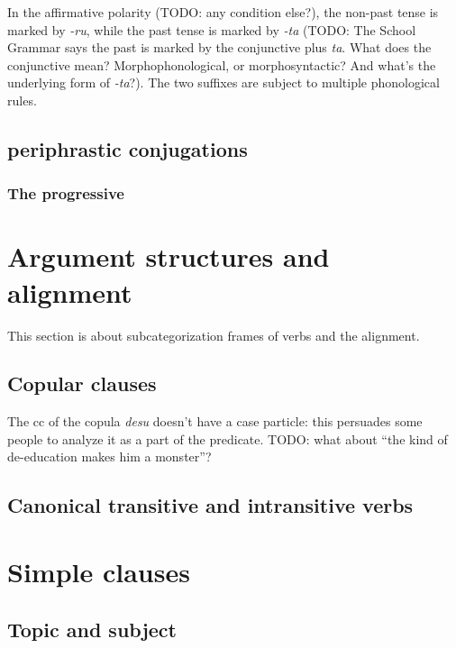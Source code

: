 \documentclass[UTF8, a4paper, oneside, scheme=plain]{ctexart}
\newcommand{\corpus}[1]{\emph{#1}}
\begin{document}
In the affirmative polarity (TODO: any condition else?),
the non-past tense is marked by \corpus{-ru},
while the past tense is marked by \corpus{-ta} (TODO: The School Grammar says the past is marked by the conjunctive plus \corpus{ta}. What does the conjunctive mean? Morphophonological, or morphosyntactic? And what's the underlying form of \corpus{-ta}?).
The two suffixes are subject to multiple phonological rules.


\subsection{periphrastic conjugations}

\subsubsection{The progressive}

\section{Argument structures and alignment}\label{sec:arguments}

This section is about subcategorization frames of verbs and the alignment.

\subsection{Copular clauses}

The \ac{cc} of the copula \corpus{desu} doesn't have a case particle:
this persuades some people to analyze it as a part of the predicate.
TODO: what about ``the kind of de-education makes him a monster''?

\subsection{Canonical transitive and intransitive verbs}

\section{Simple clauses}

\subsection{Topic and subject}\label{sec:topic-subject}
\end{document}
